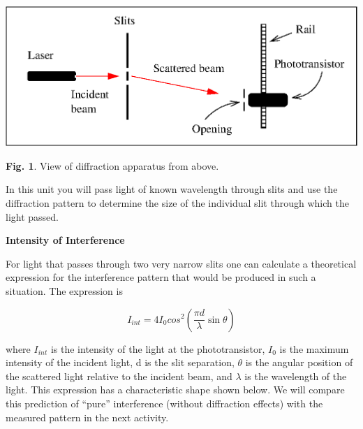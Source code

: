 \vspace{0.3cm}
\begin{center}
\includegraphics{diffraction/diffraction_of_light_fig1b.eps}
\end{center}
\vspace{0.3cm}

{\centering \textbf{Fig. 1}. View of diffraction apparatus from above.\par}

In this unit you will  pass light of known wavelength through slits 
and use the diffraction pattern to determine the size of the individual
slit through which the light passed.

\newpage

\textbf{Intensity of Interference }

For light that passes through two very narrow slits one can calculate
a theoretical expression for the interference pattern that would be
produced in such a situation. The expression is 

\begin{equation} I_{int} = 4I_0 cos^2 \left (\frac {\pi d} {\lambda} \sin \theta \right ) \end{equation}

where $I_{int}$ is the intensity of the light at the phototransistor,
$I_{0}$ is the maximum intensity of the incident light, d is
the slit separation, \( \theta  \) is the angular position of the
scattered light relative to the incident beam, and \( \lambda  \)
is the wavelength of the light. This expression has a characteristic
shape shown below. We will compare this prediction of {}``pure''
interference (without diffraction effects) with the measured pattern
in the next activity.

